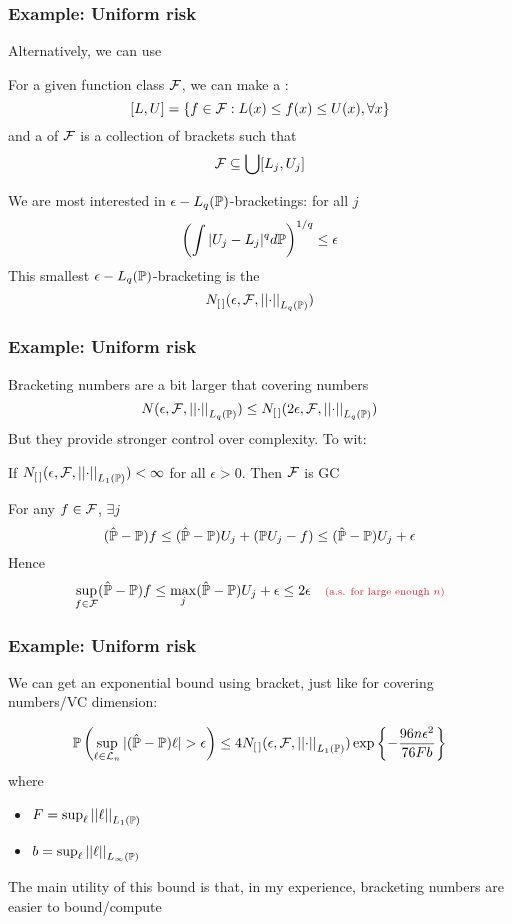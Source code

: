 \documentclass[12pt]{beamer}
\newcommand{\parenthetical}[2]{#1  \scriptstyle \alr{( #2)}}
\begin{document}
\begin{frame}[fragile]
\frametitle{Example: Uniform risk }
Alternatively, we can use  

\vsp
For a given function class $\F$, we can make a :
\[
[L,U] = \{f \in \F: L(x) \leq f(x) \leq U(x), \forall x\}
\]
and a  of $\F$ is a collection of brackets such that
\[
\F \subseteq \bigcup [L_j,U_j]
\]

We are most interested in $\epsilon-L_q(\P)$-bracketings: for all $j$
\[
\left(\int |U_j - L_j|^q d\P\right)^{1/q} \leq \epsilon
\]
This smallest $\epsilon-L_q(\P)$-bracketing is the 
\[
N_{[\,]}(\epsilon, \F, \norm{\cdot}_{L_q(\P)})
\]
\end{frame}

\begin{frame}[fragile]
\frametitle{Example: Uniform risk }
Bracketing numbers are a bit larger that covering numbers
\[
N(\epsilon, \F, \norm{\cdot}_{L_q(\P)}) \leq N_{[\,]}(2\epsilon, \F, \norm{\cdot}_{L_q(\P)})
\]
But they provide stronger control over complexity.  To wit:

\vsp
{}  If $N_{[\,]}(\epsilon, \F, \norm{\cdot}_{L_1(\P)}) < \infty$ for all $\epsilon > 0$.  Then
$\F$ is GC

\vsp
{} For any $f \in \F$, $\exists j$
\[
(\hat\P - \P)f \leq (\hat\P - \P)U_j + (\P U_j - f) \leq (\hat\P - \P)U_j + \epsilon
\]
Hence
\[
\sup_{f \in \F} (\hat\P - \P)f  \leq \max_j (\hat\P - \P)U_j + \epsilon \leq 2\epsilon \parenthetical{\quad}{\textrm{a.s. for large enough $n$}}
\]

\end{frame}

\begin{frame}[fragile]
\frametitle{Example: Uniform risk }
We can get an exponential bound using bracket, just like for covering numbers/VC dimension:

\[
\P\left( \sup_{\ell \in \mathcal{L}_n}|(\hat\P - \P)\ell| > \epsilon\right) 
\leq
4N_{[\,]}(\epsilon, \F, \norm{\cdot}_{L_1(\P)})\exp\left\{ -\frac{96n\epsilon^2}{76Fb}\right\}
\]
where 
\begin{itemize}
\item $F = \sup_\ell \norm{\ell}_{L_1(\P)}$
\item $b = \sup_{\ell} \norm{\ell}_{L_\infty(\P)}$
\end{itemize}

\vsp
The main utility of this bound is that, in my experience, bracketing numbers are easier to bound/compute
\end{frame}
\end{document}
